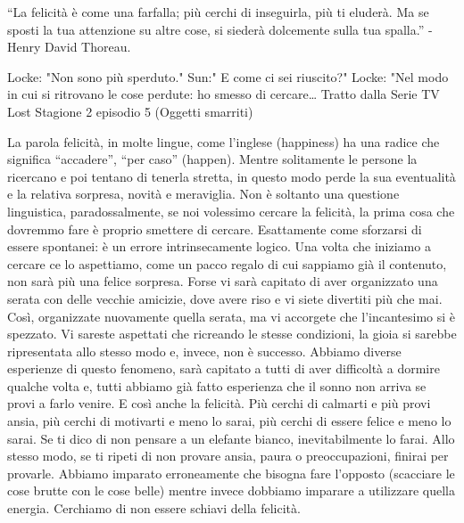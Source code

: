 \documentclass[12pt]{book} %
\begin{document}
“La felicità è come una farfalla; più cerchi di inseguirla, più ti eluderà. Ma se sposti la tua attenzione su altre
cose, si siederà dolcemente sulla tua spalla.” - Henry David Thoreau.

Locke: "Non sono più sperduto." 
Sun:" E come ci sei riuscito?" 
Locke: "Nel modo in cui si ritrovano le cose perdute: ho smesso di cercare…
Tratto dalla Serie TV Lost Stagione 2 episodio 5 (Oggetti smarriti)

La parola felicità, in molte lingue, come l'inglese (happiness) ha una radice che significa
“accadere”, “per caso” (happen). Mentre solitamente le persone la ricercano e poi tentano di tenerla stretta, in questo
modo perde la sua eventualità e la relativa sorpresa, novità e meraviglia. Non è soltanto una questione linguistica,
paradossalmente, se noi volessimo cercare la felicità, la prima cosa che dovremmo fare è proprio smettere di cercare.
Esattamente come sforzarsi di essere spontanei: è un errore intrinsecamente logico. Una volta che iniziamo a cercare ce
lo aspettiamo, come un pacco regalo di cui sappiamo già il contenuto, non sarà più una felice sorpresa. Forse vi sarà
capitato di aver organizzato una serata con delle vecchie amicizie, dove avere riso e vi siete divertiti più che mai.
Così, organizzate nuovamente quella serata, ma vi accorgete che l'incantesimo si è spezzato. Vi
sareste aspettati che ricreando le stesse condizioni, la gioia si sarebbe ripresentata allo stesso modo e, invece, non
è successo. Abbiamo diverse esperienze di questo fenomeno, sarà capitato a tutti di aver difficoltà a dormire qualche volta e, tutti abbiamo già fatto esperienza che il sonno non arriva se provi a farlo venire. E così anche la felicità. 
Più cerchi di calmarti e più provi ansia, più cerchi di motivarti e meno lo sarai, più cerchi di essere felice e meno lo sarai.
Se ti dico di non pensare a un elefante bianco, inevitabilmente lo farai. Allo stesso modo, se ti ripeti di non provare ansia, paura o preoccupazioni, finirai per provarle. Abbiamo imparato erroneamente che bisogna fare l'opposto (scacciare le cose brutte con le cose belle) mentre invece dobbiamo imparare a utilizzare quella energia.
Cerchiamo di non essere schiavi della felicità.
\end{document}
